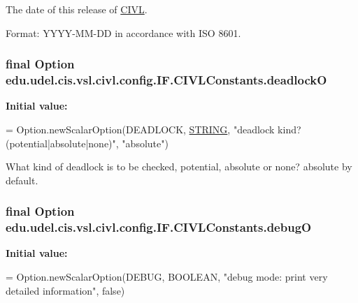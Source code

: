 The date of this release of \hyperlink{classedu_1_1udel_1_1cis_1_1vsl_1_1civl_1_1CIVL}{C\+I\+V\+L}. 

Format\+: Y\+Y\+Y\+Y-\/\+M\+M-\/\+D\+D in accordance with I\+S\+O 8601. \hypertarget{classedu_1_1udel_1_1cis_1_1vsl_1_1civl_1_1config_1_1IF_1_1CIVLConstants_a795542d3bb4e96bda6d434801756c06d}{}
\subsubsection[{deadlock\+O}]{\setlength{\rightskip}{0pt plus 5cm}final Option edu.\+udel.\+cis.\+vsl.\+civl.\+config.\+I\+F.\+C\+I\+V\+L\+Constants.\+deadlock\+O\hspace{0.3cm}{\ttfamily [static]}}\label{classedu_1_1udel_1_1cis_1_1vsl_1_1civl_1_1config_1_1IF_1_1CIVLConstants_a795542d3bb4e96bda6d434801756c06d}
{\bfseries Initial value\+:}
\begin{DoxyCode}
= Option.newScalarOption(DEADLOCK,
            \hyperlink{struct__STRING}{STRING}, \textcolor{stringliteral}{"deadlock kind? (potential|absolute|none)"}, \textcolor{stringliteral}{"absolute"})
\end{DoxyCode}


What kind of deadlock is to be checked, potential, absolute or none? absolute by default. 

\hypertarget{classedu_1_1udel_1_1cis_1_1vsl_1_1civl_1_1config_1_1IF_1_1CIVLConstants_a4aadd98fe52dfe3cafd903b857ac478a}{}
\subsubsection[{debug\+O}]{\setlength{\rightskip}{0pt plus 5cm}final Option edu.\+udel.\+cis.\+vsl.\+civl.\+config.\+I\+F.\+C\+I\+V\+L\+Constants.\+debug\+O\hspace{0.3cm}{\ttfamily [static]}}\label{classedu_1_1udel_1_1cis_1_1vsl_1_1civl_1_1config_1_1IF_1_1CIVLConstants_a4aadd98fe52dfe3cafd903b857ac478a}
{\bfseries Initial value\+:}
\begin{DoxyCode}
= Option.newScalarOption(DEBUG, BOOLEAN,
            \textcolor{stringliteral}{"debug mode: print very detailed information"}, \textcolor{keyword}{false})
\end{DoxyCode}


